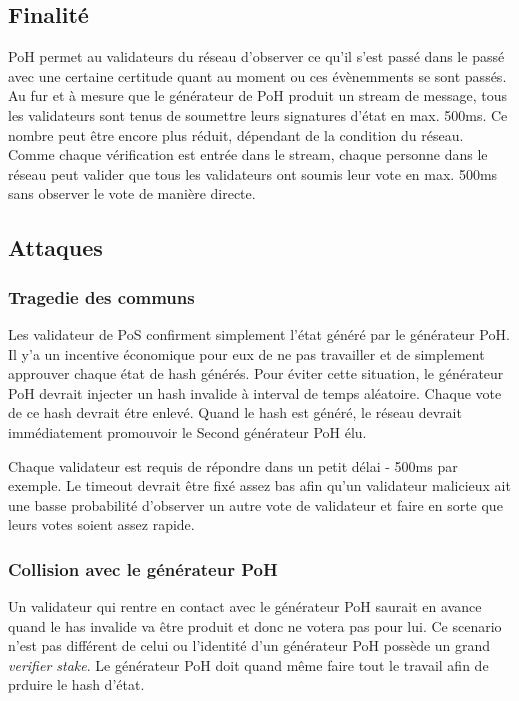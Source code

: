 \documentclass[12pt]{article}
\begin{document}
\subsection{Finalité}\label{disponibility}
PoH permet au validateurs du réseau d'observer ce qu'il s'est passé dans le passé avec une certaine certitude quant au moment ou ces évènemments se sont passés. Au fur et à mesure que le générateur de PoH produit un stream de message, tous les validateurs sont tenus de soumettre leurs signatures d'état en max. 500ms. Ce nombre peut être encore plus réduit, dépendant de la condition du réseau. Comme chaque vérification est entrée dans le stream, chaque personne dans le réseau peut valider que tous les validateurs ont soumis leur vote en max. 500ms sans observer le vote de manière directe.

\subsection{Attaques}
\subsubsection{Tragedie des communs}
Les validateur de PoS confirment simplement l'état généré par le générateur PoH. Il y'a un incentive économique pour eux de ne pas travailler et de simplement approuver chaque état de hash générés. Pour éviter cette situation, le générateur PoH devrait injecter un hash invalide à interval de temps aléatoire. Chaque vote de ce hash devrait étre enlevé. Quand le hash est généré, le réseau devrait immédiatement promouvoir le Second générateur PoH élu.

Chaque validateur est requis de répondre dans un petit délai - 500ms par exemple. Le timeout devrait être fixé assez bas afin qu'un validateur malicieux ait une basse probabilité d'observer un autre vote de validateur et faire en sorte que leurs votes soient assez rapide.

\subsubsection{Collision avec le générateur PoH}\label{subsubsec:Collision}
Un validateur qui rentre en contact avec le générateur PoH saurait en avance quand le has invalide va être produit et donc ne votera pas pour lui. Ce scenario n'est pas différent de celui ou l'identité d'un générateur PoH possède un grand \textit{verifier stake}. Le générateur PoH doit quand même faire tout le travail afin de prduire le hash d'état.
\end{document}
